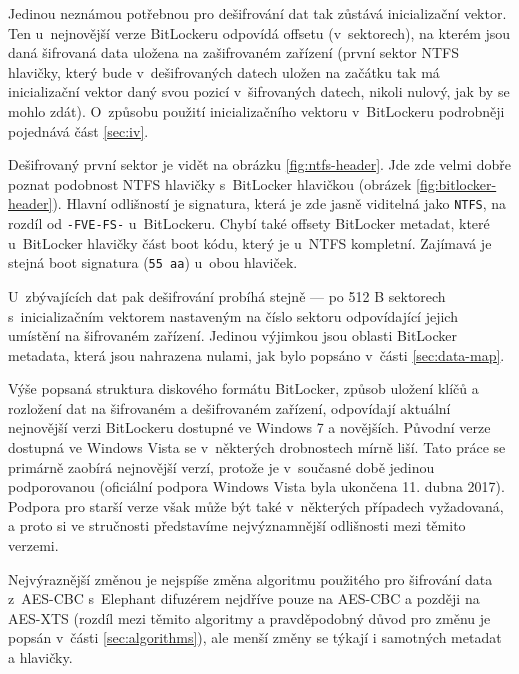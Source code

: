 Jedinou neznámou potřebnou pro dešifrování dat tak zůstává inicializační vektor. Ten u~nejnovější verze BitLockeru odpovídá offsetu (v~sektorech), na kterém jsou daná šifrovaná data uložena na zašifrovaném zařízení (první sektor NTFS hlavičky, který bude v~dešifrovaných datech uložen na začátku tak má inicializační vektor daný svou pozicí v~šifrovaných datech, nikoli nulový, jak by se mohlo zdát). O~způsobu použití inicializačního vektoru v~BitLockeru podrobněji pojednává část \ref{sec:iv}.

Dešifrovaný první sektor je vidět na obrázku \ref{fig:ntfs-header}. Jde zde velmi dobře poznat podobnost NTFS hlavičky s~BitLocker hlavičkou (obrázek \ref{fig:bitlocker-header}). Hlavní odlišností je signatura, která je zde jasně viditelná jako \texttt{NTFS}, na rozdíl od \texttt{-FVE-FS-} u~BitLockeru. Chybí také offsety BitLocker metadat, které u~BitLocker hlavičky  část boot kódu, který je u~NTFS kompletní. Zajímavá je stejná boot signatura (\texttt{55 aa}) u~obou hlaviček.

U~zbývajících dat pak dešifrování probíhá stejně --- po 512 B sektorech s~inicializačním vektorem nastaveným na číslo sektoru odpovídající jejich umístění na šifrovaném zařízení. Jedinou výjimkou jsou oblasti BitLocker metadata, která jsou nahrazena nulami, jak bylo popsáno v~části \ref{sec:data-map}.

\label{sec:old-versions}

Výše popsaná struktura diskového formátu BitLocker, způsob uložení klíčů a rozložení dat na šifrovaném a dešifrovaném zařízení, odpovídají aktuální nejnovější verzi BitLockeru dostupné ve Windows 7 a novějších. Původní verze dostupná ve Windows Vista se v~některých drobnostech mírně liší. Tato práce se primárně zaobírá nejnovější verzí, protože je v~současné době jedinou podporovanou (oficiální podpora Windows Vista byla ukončena 11. dubna 2017\cite{hfTs55csrXKY7b4F}). Podpora pro starší verze však může být také v~některých případech vyžadovaná, a proto si ve stručnosti představíme nejvýznamnější odlišnosti mezi těmito verzemi.

Nejvýraznější změnou je nejspíše změna algoritmu použitého pro šifrování data z~AES-CBC s~Elephant difuzérem nejdříve pouze na AES-CBC\cite{Rosendorf2013} a později na AES-XTS\cite{Sosnowski2016} (rozdíl mezi těmito algoritmy a pravděpodobný důvod pro změnu je popsán v~části \ref{sec:algorithms}), ale menší změny se týkají i samotných metadat a hlavičky.


